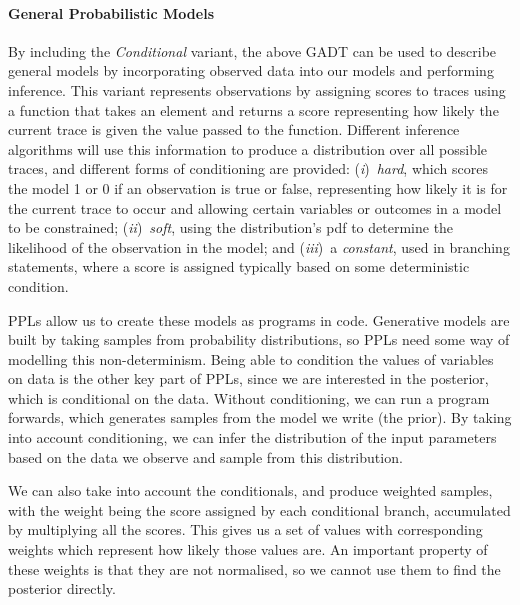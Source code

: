 \documentclass[sigconf]{acmart}
\newcommand{\one}{({\em i})\/}
\newcommand{\two}{({\em ii})\/}
\newcommand{\three}{({\em iii})\/}
\begin{document}
\paragraph{General Probabilistic Models}
By including the \emph{Conditional} variant, the above GADT can be used to describe general models by incorporating observed data into our models and performing inference. This variant represents observations by assigning scores to traces using a function that takes an element and returns a score representing how likely the current trace is given the value passed to the function. Different inference algorithms will use this information to produce a distribution over all possible traces, and different forms of conditioning are provided: \one~\emph{hard}, which scores the model 1 or 0 if an observation is true or false,  representing how likely it is for the current trace to occur and allowing certain variables or outcomes in a model to be constrained; \two~\emph{soft}, using the distribution's pdf to determine the likelihood of the observation in the model; and \three~a \emph{constant}, used in branching statements, where a score is assigned typically based on some deterministic condition.

PPLs allow us to create these models as programs in code. Generative models are built by taking samples from probability distributions, so PPLs need some way of modelling this non-determinism. Being able to condition the values of variables on data is the other key part of PPLs, since we are interested in the posterior, which is conditional on the data. Without conditioning, we can run a program forwards, which generates samples from the model we write (the prior). By taking into account conditioning, we can infer the distribution of the input parameters based on the data we observe and sample from this distribution.

We can also take into account the conditionals, and produce weighted samples, with the weight being the score assigned by each conditional branch, accumulated by multiplying all the scores. This gives us a set of values with corresponding weights which represent how likely those values are. An important property of these weights is that they are not normalised, so we cannot use them to find the posterior directly.
\end{document}
